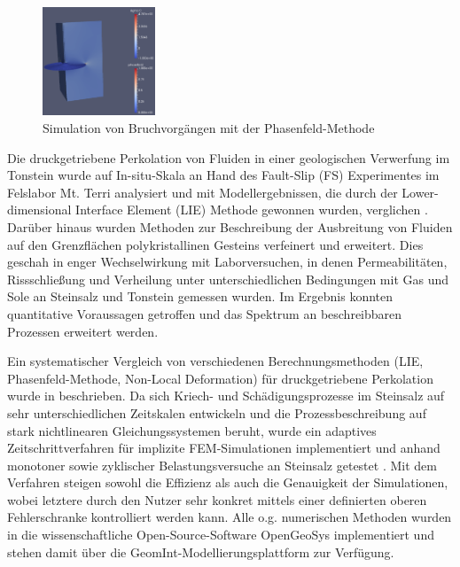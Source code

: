 \begin{figure}
\vspace{-5mm}
\includegraphics[width=0.3\textwidth]{figures/geomint-me3-01a.png}
\caption{Simulation von Bruchvorgängen mit der Phasenfeld-Methode \cite{Yoshioka2020}}
\label{fig:wp2}
\end{figure}
Die druckgetriebene Perkolation von Fluiden in einer geologischen Verwerfung im Tonstein wurde auf In-situ-Skala an Hand des Fault-Slip (FS) Experimentes im Felslabor Mt. Terri analysiert und mit Modellergebnissen, die durch der Lower-dimensional Interface Element (LIE) Methode gewonnen wurden, verglichen \cite{Vowinckel2020}. 
%
Darüber hinaus wurden Methoden zur Beschreibung der Ausbreitung von Fluiden auf den Grenzflächen polykristallinen Gesteins verfeinert und erweitert. Dies geschah in enger Wechselwirkung mit Laborversuchen, in denen Permeabilitäten, Rissschlie{\ss}ung und Verheilung unter unterschiedlichen Bedingungen mit Gas und Sole an Steinsalz und Tonstein gemessen wurden. Im Ergebnis konnten quantitative Voraussagen getroffen und das Spektrum an beschreibbaren Prozessen erweitert werden.

Ein systematischer Vergleich von verschiedenen Berechnungsmethoden (LIE, Phasenfeld-Methode, Non-Local Deformation) für druckgetriebene Perkolation wurde in \cite{Yoshioka2019} beschrieben.
%
Da sich Kriech- und Schädigungsprozesse im Steinsalz auf sehr unterschiedlichen Zeitskalen entwickeln und die Prozessbeschreibung auf stark nichtlinearen Gleichungssystemen beruht, wurde ein adaptives Zeitschrittverfahren für implizite FEM-Simulationen implementiert und anhand monotoner sowie zyklischer Belastungsversuche an Steinsalz getestet \cite{Zhang2020}. Mit dem Verfahren steigen sowohl die Effizienz als auch die Genauigkeit der Simulationen, wobei letztere durch den Nutzer sehr konkret mittels einer definierten oberen Fehlerschranke kontrolliert werden kann.
%
Alle o.g. numerischen Methoden wurden in die wissenschaftliche Open-Source-Software OpenGeoSys implementiert und stehen damit über die GeomInt-Modellierungsplattform zur Verfügung.

